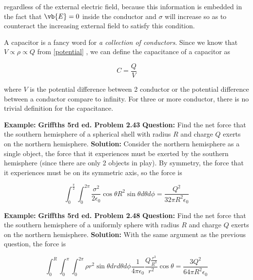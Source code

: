 \documentclass[a4paper,12pt]{report}
\begin{document}
	regardless of the external electric field, because this information is embedded in the fact that \(\vb{E} = 0\) inside the conductor and \(\sigma \) will increase so as to counteract the increasing external field to satisfy this condition.
	
	A capacitor is a fancy word for \emph{a collection of conductors}. Since we know that \(V \propto \rho \propto Q\) from \cref{potential} , we can define the capacitance of a capacitor as
	
	\begin{equation}
		C = \frac{Q}{V} 	
	\end{equation}
	
	where \(V\) is the potential difference between 2 conductor or the potential difference between a conductor compare to infinity. For three or more conductor, there is no trivial definition for the capacitance.
	
	\begin{example_template}
		\textbf{Example:} \textbf{Griffths 5rd ed. Problem 2.43} \newline \newline
		\textbf{Question:} Find the net force that the southern hemisphere of a spherical shell with radius \(R\) and charge \(Q\) exerts on the northern hemisphere.  \newline \newline
		\textbf{Solution:}  Consider the northern hemisphere as a single object, the force that it experiences must be exerted by the southern hemisphere (since there are only 2 objects in play). By symmetry, the force that it experiences must be on its symmetric axis, so the force is 
		
		\begin{equation}
			\int_{0}^{\frac{\pi }{2} } \int_{0}^{2\pi } \frac{\sigma ^2}{2 \epsilon_0} \cos \theta R^2 \sin \theta d\theta d\phi = \frac{Q^2}{32 \pi R^2 \epsilon_0}   
		\end{equation} \label{jk}
		
	\end{example_template}
	
	
	\begin{example_template}
		\textbf{Example:} \textbf{Griffths 5rd ed. Problem 2.48} \newline \newline
		\textbf{Question:} Find the net force that the southern hemisphere of a uniformly sphere with radius \(R\) and charge \(Q\) exerts on the northern hemisphere. \newline \newline
		\textbf{Solution:}  With the same argument as the previous question, the force is
		
		\begin{equation}
			\int_{0}^{R} \int_{0}^{\pi } \int_{0}^{2\pi }    \rho r^2\sin \theta drd\theta d\phi  \frac{1}{4\pi\epsilon_0} \frac{Q\frac{r^3}{R^3} }{r^2} \cos \theta = \frac{3Q^2}{64\pi R^2 \epsilon_0}	\end{equation}
		
	\end{example_template}
	
\end{document}
